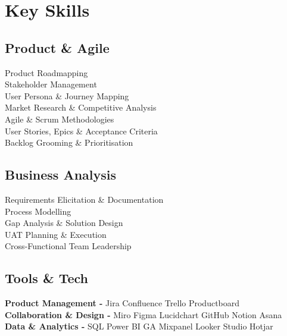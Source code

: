 \documentclass[]{deedy-resume-reversed}
\begin{document}
\begin{minipage}[t]{0.33\textwidth}

\section{Key Skills}

\subsection{Product \& Agile}
Product Roadmapping\\
Stakeholder Management\\
User Persona \& Journey Mapping\\
Market Research \& Competitive Analysis\\
Agile \& Scrum Methodologies\\
User Stories, Epics \& Acceptance Criteria\\
Backlog Grooming \& Prioritisation\\

\sectionsep

\subsection{Business Analysis}
Requirements Elicitation \& Documentation\\
Process Modelling\\
Gap Analysis \& Solution Design\\
UAT Planning \& Execution\\
Cross-Functional Team Leadership\\
\sectionsep

\subsection{Tools \& Tech}

\textbf{Product Management -} Jira \textbullet{} Confluence \textbullet{} Trello \textbullet{} Productboard\\
\textbf{Collaboration \& Design -} Miro \textbullet{} Figma \textbullet{} Lucidchart \textbullet{} GitHub \textbullet{} Notion \textbullet{} Asana\\
\textbf{Data \& Analytics -} SQL \textbullet{} Power BI \textbullet{} GA \textbullet{} Mixpanel \textbullet{} Looker Studio \textbullet{} Hotjar\\
\sectionsep


\end{minipage}
\end{document}
